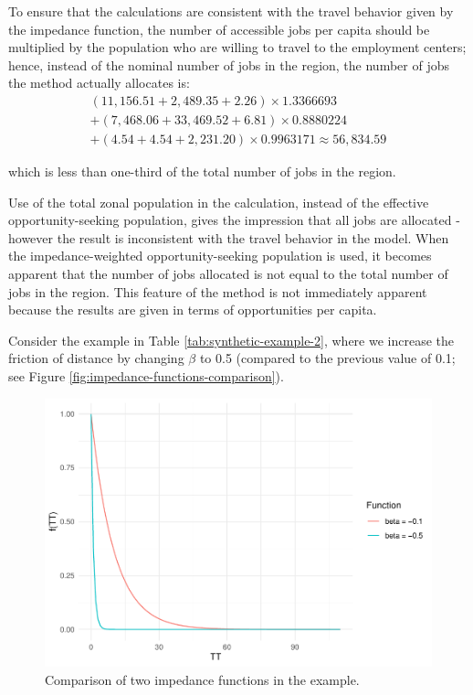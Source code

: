 \documentclass[]{elsarticle} %
\begin{document}
To ensure that the calculations are consistent with the travel behavior
given by the impedance function, the number of accessible jobs per
capita should be multiplied by the population who are willing to travel
to the employment centers; hence, instead of the nominal number of jobs
in the region, the number of jobs the method actually allocates is: \[
\begin{array}{l}
(11,156.51 + 2,489.35 + 2.26)\times 1.3366693 \\
+ (7,468.06 + 33,469.52 + 6.81)\times 0.8880224\\
+ (4.54 + 4.54 + 2,231.20)\times 0.9963171 \approx 56,834.59
\end{array}
\]

\noindent which is less than one-third of the total number of jobs in
the region.

Use of the total zonal population in the calculation, instead of the
effective opportunity-seeking population, gives the impression that all
jobs are allocated - however the result is inconsistent with the travel
behavior in the model. When the impedance-weighted opportunity-seeking
population is used, it becomes apparent that the number of jobs
allocated is not equal to the total number of jobs in the region. This
feature of the method is not immediately apparent because the results
are given in terms of opportunities per capita.

Consider the example in Table \ref{tab:synthetic-example-2}, where we
increase the friction of distance by changing \(\beta\) to 0.5 (compared
to the previous value of 0.1; see Figure
\ref{fig:impedance-functions-comparison}).

\begin{figure}
\includegraphics[width=1\linewidth]{Spatial-Availability-Refreshed_files/figure-latex/comparison-impedance-functions-synthetic-example-1} \caption{\label{fig:impedance-functions-comparison}Comparison of two impedance functions in the example.}\label{fig:comparison-impedance-functions-synthetic-example}
\end{figure}
\end{document}
